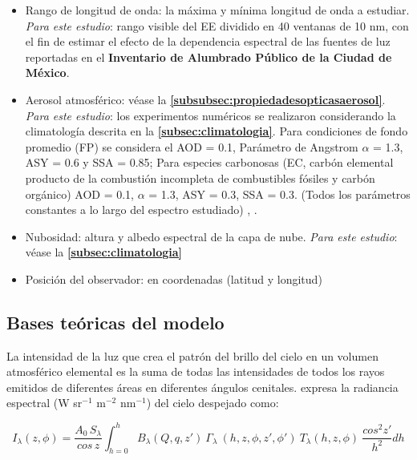 \begin{itemize}

    \item Rango de longitud de onda: la máxima y mínima longitud de onda a estudiar. \textit{Para este estudio}: rango visible del EE dividido en 40 ventanas de 10 nm, con el fin  de estimar el efecto de la dependencia espectral de las fuentes de luz reportadas en el \textbf{Inventario de Alumbrado Público de la Ciudad de México}.
    
    \item Aerosol atmosférico: véase la \textbf{\autoref{subsubsec:propiedadesopticasaerosol}}. \textit{Para este estudio}: los experimentos numéricos se realizaron considerando la climatología descrita en la \textbf{\autoref{subsec:climatologia}}. Para condiciones de fondo promedio (FP) se considera el AOD = 0.1, Parámetro de Angstrom $\alpha$ = 1.3, ASY = 0.6 y SSA = 0.85; Para especies carbonosas (EC, carbón elemental producto de la combustión incompleta de combustibles fósiles y carbón orgánico) AOD = 0.1, $\alpha$ = 1.3, ASY = 0.3, SSA = 0.3. (Todos los parámetros constantes a lo largo del espectro estudiado) \citep{Penner1998}, \citep{Schmidt2010}.
    
    \item Nubosidad: altura y albedo espectral de la capa de nube. \textit{Para este estudio}: véase la \textbf{\autoref{subsec:climatologia}}
    
    \item Posición del observador: en coordenadas (latitud y longitud) 
    
\end{itemize}

\subsection{Bases teóricas del modelo}

La intensidad de la luz que crea el patrón del brillo del cielo en un volumen atmosférico elemental es la suma de todas las intensidades de todos los rayos emitidos de diferentes áreas en diferentes ángulos cenitales. \cite{Kocifaj2007} expresa la radiancia espectral (W sr$^{-1}$  m$^{-2}$ nm$^{-1}$) del cielo despejado como:

\begin{equation}\label{eq:2.1}
I_{\lambda}(z, \phi) = \frac{A_{0}\, S_{\lambda}}{cos\,z} \int_{h=0}^{h} B_{\lambda}(Q, q, z') \: \Gamma_{\lambda} \:(h, z, \phi, z', \phi') \: T_{\lambda}(h, z, \phi) \: \frac{cos^{2}z'}{h^{2}} dh
\end{equation}

